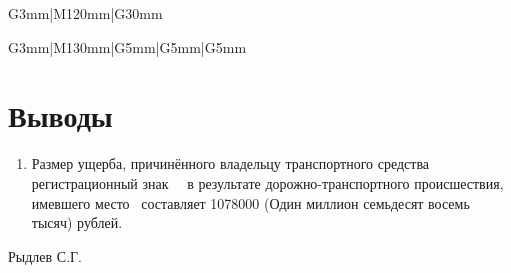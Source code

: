 \begin{longtable}{G{3mm}|M{120mm}|G{30mm}}
\begin{longtable}{G{3mm}|M{130mm}|G{5mm}|G{5mm}|G{5mm}}
\section{Выводы}
%
%
\begin{enumerate}
\item Размер ущерба, причинённого владельцу  транспортного средства \tc\, регистрационный знак \, \, в результате дорожно-транспортного происшествия, имевшего место \,  составляет 1078000 (Один миллион семьдесят восемь тысяч) рублей.
\end{enumerate}
\vspace{10mm}
      \hfill                      {Рыдлев С.Г.}%
\vspace{7mm}
\relax


\end{longtable}
\end{longtable}
